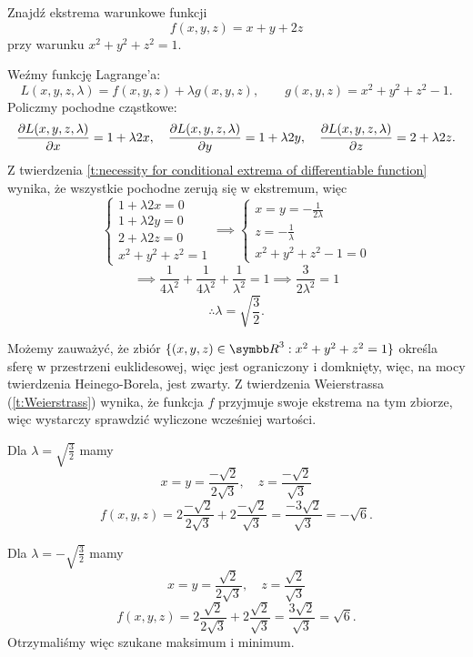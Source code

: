 \begin{example}
    Znajdź ekstrema warunkowe funkcji
    \[ f(x, y, z) = x + y + 2z \]
    przy warunku $x^2 + y^2 + z^2 = 1$.
\end{example}
\begin{solution}
    Weźmy funkcję Lagrange'a:
    \[ L(x, y, z, \lambda) = f(x, y, z) + \lambda g(x, y, z), \qquad g(x, y, z) = x^2 + y^2 + z^2 - 1. \]
    Policzmy pochodne cząstkowe:
    \[ \frac{\operatorname{\partial}\!{L}(x, y, z, \lambda)}{\operatorname{\partial}\!{x}} = 1 + \lambda 2x, \quad \frac{\operatorname{\partial}\!{L}(x, y, z, \lambda)}{\operatorname{\partial}\!{y}} = 1 + \lambda 2y, \quad \frac{\operatorname{\partial}\!{L}(x, y, z, \lambda)}{\operatorname{\partial}\!{z}} = 2 + \lambda 2z. \]
    Z twierdzenia \ref{t:necessity for conditional extrema of differentiable function} wynika, że wszystkie pochodne zerują się w ekstremum, więc
    \[ \begin{cases} 1 + \lambda 2x = 0 \\ 1 + \lambda 2y = 0 \\ 2 + \lambda 2z = 0 \\ x^2 + y^2 + z^2 = 1 \end{cases} \implies \begin{cases} x = y = -\frac{1}{2\lambda} \\ z = -\frac{1}{\lambda} \\ x^2 + y^2 + z^2 - 1 = 0 \end{cases} \]
    \[ \implies \frac{1}{4\lambda^2} + \frac{1}{4\lambda^2} + \frac{1}{\lambda^2} = 1 \implies \frac{3}{2\lambda^2} = 1 \]
    \[ \therefore \lambda = \sqrt{\frac{3}{2}}. \]

    Możemy zauważyć, że zbiór $\{(x, y, z) \in \RR^3 : x^2 + y^2 + z^2 = 1\}$ określa sferę w przestrzeni euklidesowej, więc jest ograniczony i domknięty, więc, na mocy twierdzenia Heinego-Borela, jest zwarty. Z twierdzenia Weierstrassa (\ref{t:Weierstrass}) wynika, że funkcja $f$ przyjmuje swoje ekstrema na tym zbiorze, więc wystarczy sprawdzić wyliczone wcześniej wartości.

    Dla $\lambda = \sqrt{\frac{3}{2}}$ mamy
    \[ x = y = \frac{-\sqrt{2}}{2\sqrt{3}}, \quad z = \frac{-\sqrt{2}}{\sqrt{3}} \]
    \[ f(x, y, z) = 2\frac{-\sqrt{2}}{2\sqrt{3}} + 2\frac{-\sqrt{2}}{\sqrt{3}} = \frac{-3\sqrt{2}}{\sqrt{3}} = -\sqrt{6}. \]

    Dla $\lambda = -\sqrt{\frac{3}{2}}$ mamy
    \[ x = y = \frac{\sqrt{2}}{2\sqrt{3}}, \quad z = \frac{\sqrt{2}}{\sqrt{3}} \]
    \[ f(x, y, z) = 2\frac{\sqrt{2}}{2\sqrt{3}} + 2\frac{\sqrt{2}}{\sqrt{3}} = \frac{3\sqrt{2}}{\sqrt{3}} = \sqrt{6}. \]
    Otrzymaliśmy więc szukane maksimum i minimum.
\end{solution}